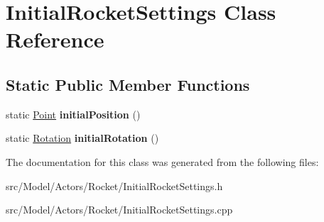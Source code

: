 \hypertarget{classInitialRocketSettings}{}\section{Initial\+Rocket\+Settings Class Reference}
\label{classInitialRocketSettings}
\subsection*{Static Public Member Functions}
\begin{DoxyCompactItemize}
\item 
static \hyperlink{classPoint}{Point} {\bfseries initial\+Position} ()\hypertarget{classInitialRocketSettings_a7b3067d1d07083b451545bd837ef6e2d}{}\label{classInitialRocketSettings_a7b3067d1d07083b451545bd837ef6e2d}

\item 
static \hyperlink{classRotation}{Rotation} {\bfseries initial\+Rotation} ()\hypertarget{classInitialRocketSettings_a00643433517033fd4dbaa6bd3f9bbf5f}{}\label{classInitialRocketSettings_a00643433517033fd4dbaa6bd3f9bbf5f}

\end{DoxyCompactItemize}


The documentation for this class was generated from the following files\+:\begin{DoxyCompactItemize}
\item 
src/\+Model/\+Actors/\+Rocket/Initial\+Rocket\+Settings.\+h\item 
src/\+Model/\+Actors/\+Rocket/Initial\+Rocket\+Settings.\+cpp\end{DoxyCompactItemize}
